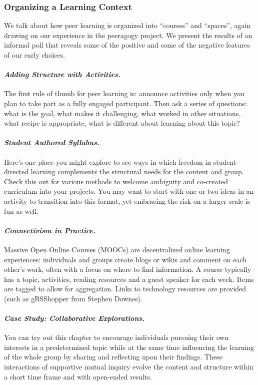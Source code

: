 \subsubsection{Organizing a Learning Context}

\noindent We talk about how peer learning is organized into ``courses'' and
``spaces'', again drawing on our experience in the peeragogy project. We
present the results of an informal poll that reveals some of the
positive and some of the negative features of our early choices.

\paragraph{\emph{Adding Structure with Activities.}} The first rule of thumb for
peer learning is: announce activities only when you plan to take part as
a fully engaged participant. Then ask a series of questions: what is the
goal, what makes it challenging, what worked in other situations, what
recipe is appropriate, what is different about learning about this
topic?

\paragraph{\emph{Student Authored Syllabus.}} Here's one place you might
explore to see ways in which freedom in student-directed learning
complements the structural needs for the content and group. Check this
out for various methods to welcome ambiguity and co-created curriculum
into your projects. You may want to start with one or two ideas in an
activity to transition into this format, yet embracing the risk on a
larger scale is fun as well.

\paragraph{\emph{Connectivism in Practice.}} Massive Open
Online Courses (MOOCs) are decentralized online learning experiences:
individuals and groups create blogs or wikis and comment on each
other's work, often with a focus on where to find information. A
course typically has a topic, activities, reading resources and a
guest speaker for each week. Items are tagged to allow for
aggregation. Links to technology resources are provided (such as
gRSShopper from Stephen Downes).

\paragraph{\emph{Case Study: Collaborative Explorations.}} You can try out this
chapter to encourage individuals pursuing their own interests in a
predetermined topic while at the same time influencing the learning of
the whole group by sharing and reflecting upon their findings. These
interactions of supportive mutual inquiry evolve the content and
structure within a short time frame and with open-ended results.

